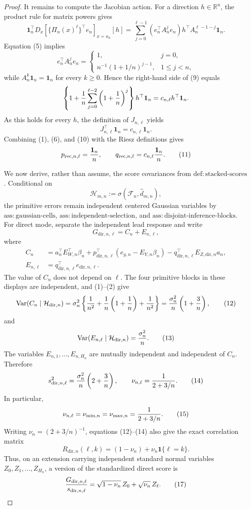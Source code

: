 \documentclass{article}
\begin{document}
\begin{proof}
It remains to compute the Jacobian action.  For a direction \(h\in\mathbb R^n\), the product rule for matrix powers gives
\[
 \boldsymbol 1_n^{\top}D_x[\{\Pi_n(x)^\ell\}^{\top}e_n]_{x=a_n}[h]
 =\sum_{j=0}^{\ell-1}(e_n^{\top}A_n^je_n)
      h^{\top}A_n^{\ell-1-j}\boldsymbol 1_n.
 \tag{9}
\]
Equation (5) implies
\[
 e_n^{\top}A_n^je_n=
 \begin{cases}
 1,&j=0,\\
 n^{-1}(1+1/n)^{j-1},&1\leq j<n,
 \end{cases}
\]
while \(A_n^k\boldsymbol 1_n=\boldsymbol 1_n\) for every \(k\geq0\).  Hence the right-hand side of (9) equals
\[
 \left\{1+{1\over n}\sum_{j=0}^{\ell-2}
          \left(1+{1\over n}\right)^j\right\}
 h^{\top}\boldsymbol 1_n
 =c_{n,\ell}h^{\top}\boldsymbol 1_n.
\]
As this holds for every \(h\), the definition of \(J_{n,\ell}\) yields
\[
 J_{n,\ell}^{\top}\boldsymbol 1_n
 =c_{n,\ell}\boldsymbol 1_n.
 \tag{10}
\]
Combining (1), (6), and (10) with the Riesz definitions gives
\[
 p_{\mathrm{rec},n,\ell}={\boldsymbol 1_n\over n},
 \qquad
 q_{\mathrm{rec},n,\ell}=c_{n,\ell}{\boldsymbol 1_n\over n}.
 \tag{11}
\]

We now derive, rather than assume, the score covariances from \(\mathrm{def{:}stacked\mbox{-}scores}\).  Conditional on
\[
 \mathcal H_{m,n}:=\sigma(\mathcal F_n,\widehat d_{m,n}),
\]
the primitive errors remain independent centered Gaussian variables by \(\mathrm{ass{:}gaussian\mbox{-}cells}\), \(\mathrm{ass{:}independent\mbox{-}selection}\), and \(\mathrm{ass{:}disjoint\mbox{-}inference\mbox{-}blocks}\).  For direct mode, separate the independent lead response and write
\[
 G_{\mathrm{dir},n,\ell}=C_n+E_{n,\ell},
\]
where
\[
\begin{aligned}
 C_n&=a_n^{\top}E_{W,n}^{\top}\beta_n
 +p_{\mathrm{dir},n,\ell}^{\top}(e_{y,n}-E_{Y,n}\beta_n)
 -q_{\mathrm{dir},n,\ell}^{\top}E_{Z,\mathrm{dir},n}a_n,\\
 E_{n,\ell}&=q_{\mathrm{dir},n,\ell}^{\top}e_{\mathrm{dir},n,\ell}.
\end{aligned}
\]
The value of \(C_n\) does not depend on \(\ell\).  The four primitive blocks in these displays are independent, and (1)--(2) give
\[
 \operatorname{Var}(C_n\mid\mathcal H_{\mathrm{dir},n})
 =\sigma_n^2\left\{{1\over n^2}
   +{1\over n}\left(1+{1\over n}\right)
   +{1\over n^2}\right\}
 ={\sigma_n^2\over n}\left(1+{3\over n}\right),
 \tag{12}
\]
and
\[
 \operatorname{Var}(E_{n,\ell}\mid\mathcal H_{\mathrm{dir},n})
 ={\sigma_n^2\over n}.
 \tag{13}
\]
The variables \(E_{n,1},\ldots,E_{n,H_n}\) are mutually independent and independent of \(C_n\).  Therefore
\[
 s_{\mathrm{dir},n,\ell}^2
 ={\sigma_n^2\over n}\left(2+{3\over n}\right),
 \qquad
 \nu_{n,\ell}={1\over 2+3/n}.
 \tag{14}
\]
In particular,
\[
 \nu_{n,\ell}=\nu_{\min,n}=\nu_{\max,n}={1\over2+3/n}.
 \tag{15}
\]
Writing \(\nu_n=(2+3/n)^{-1}\), equations (12)--(14) also give the exact correlation matrix
\[
 R_{\mathrm{dir},n}(\ell,k)
 =(1-\nu_n)+\nu_n\boldsymbol 1\{\ell=k\}.
 \tag{16}
\]
Thus, on an extension carrying independent standard normal variables \(Z_0,Z_1,\ldots,Z_{H_n}\), a version of the standardized direct score is
\[
 {G_{\mathrm{dir},n,\ell}\over s_{\mathrm{dir},n,\ell}}
 =\sqrt{1-\nu_n}\,Z_0+\sqrt{\nu_n}\,Z_\ell.
 \tag{17}
\]


\end{proof}
\end{document}
